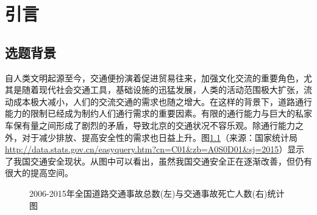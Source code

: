 \chapter{引言}
\label{cha:intro}

\section{选题背景}
\label{sec:background}
自人类文明起源至今，交通便扮演着促进贸易往来，加强文化交流的重要角色，尤其是随着现代社会交通工具，基础设施的迅猛发展，人类的活动范围极大扩张，流动成本极大减小，人们的交流交通的需求也随之增大。在这样的背景下，道路通行能力的限制已经成为制约人们通行需求的重要因素。有限的通行能力与巨大的私家车保有量之间形成了剧烈的矛盾，导致北京的交通状况不容乐观。除通行能力之外，对于减少排放、提高安全性的需求也日益上升\cite{Ploeg2014Analysis}。图\ref{fig:traffic}（来源：国家统计局 \url{http://data.stats.gov.cn/easyquery.htm?cn=C01&zb=A0S0D01&sj=2015}）显示了我国交通安全现状。从图中可以看出，虽然我国交通安全正在逐渐改善，但仍有很大的提高空间。

\begin{figure}[htbp]
\begin{minipage}[t]{0.4\linewidth}
\centering
{}
\end{minipage}%
\hspace{+2cm}
\begin{minipage}[t]{0.4\linewidth}
\centering
{}
\end{minipage}
\captionsetup{margin=3.cm}
\caption[交通事故统计图]{2006-2015年全国道路交通事故总数(左)与交通事故死亡人数(右)统计图}
\label{fig:traffic}
\end{figure}

